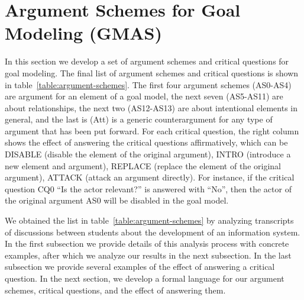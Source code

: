 \section{Argument Schemes for Goal Modeling (GMAS)}
\label{sect:gmas}

In this section we develop a set of argument schemes and critical questions for goal modeling. The final list of argument schemes and critical questions is shown in table~\ref{table:argument-schemes}. The first four argument schemes (AS0-AS4) are argument for an element of a goal model, the next seven (AS5-AS11) are about relationships, the next two (AS12-AS13) are about intentional elements in general, and the last is (Att) is a generic counterargument for any type of argument that has been put forward. For each critical question, the right column shows the effect of answering the critical questions affirmatively, which can be DISABLE (disable the element of the original argument), INTRO (introduce a new element and argument), REPLACE (replace the element of the original argument), ATTACK (attack an argument directly). For instance, if the critical question CQ0 ``Is the actor relevant?'' is answered with ``No'', then the actor of the original argument AS0 will be disabled in the goal model.

We obtained the list in table~\ref{table:argument-schemes} by analyzing transcripts of discussions between students about the development of an information system. In the first subsection we provide details of this analysis process with concrete examples, after which we analyze our results in the next subsection. In the last subsection we provide several examples of the effect of answering a critical question. In the next section, we develop a formal language for our argument schemes, critical questions, and the effect of answering them.


